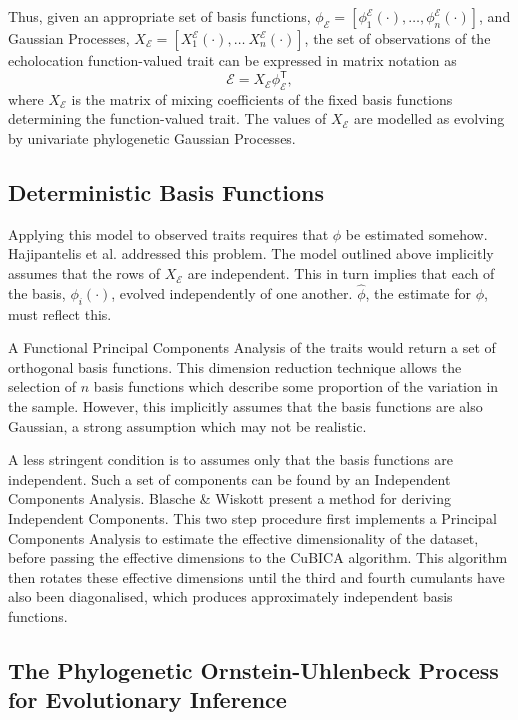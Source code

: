 \documentclass[wsdraft]{ws-rv9x6} %
\begin{document}
Thus, given an appropriate set of basis functions, \(\phi_{\mathcal{E}} = [\phi^{\mathcal{E}}_1(\cdot), \dots, \phi^{\mathcal{E}}_n(\cdot)]\), and Gaussian Processes, \(X_{\mathcal{E}} = [X_1^{\mathcal{E}}(\cdot), \dots\ X_n^{\mathcal{E}}(\cdot)]\), the set of observations of the echolocation function-valued trait can be expressed in matrix notation as 
\[
\mathcal{E} = X_{\mathcal{E}} \phi_{\mathcal{E}}^{\mathsf{T}},
\]
where \( X_{\mathcal{E}}\) is the matrix of mixing coefficients of the fixed basis functions determining the function-valued trait. The values of \( X_{\mathcal{E}}\) are modelled as evolving by univariate phylogenetic Gaussian Processes.

\subsection{Deterministic Basis Functions}

Applying this model to observed traits requires that \(\phi\) be estimated somehow. Hajipantelis et al. \cite{hadjipantelis2013function} addressed this problem. The model outlined above implicitly assumes that the rows of \(X_{\mathcal{E}}\) are independent. This in turn implies that each of the basis, \(\phi_i(\cdot)\), evolved independently of one another. \(\hat{\phi}\), the estimate for \(\phi\), must reflect this. 

A Functional Principal Components Analysis \cite{ramsay2006functional} of the traits would return a set of orthogonal basis functions. This dimension reduction technique allows the selection of \(n\) basis functions which describe some proportion of the variation in the sample. However, this implicitly assumes that the basis functions are also Gaussian, a strong assumption which may not be realistic.

A less stringent condition is to assumes only that the basis functions are independent. Such a set of components can be found by an Independent Components Analysis. Blasche \& Wiskott\cite{blaschke2004cubica} present a method for deriving Independent Components. This two step procedure first implements a Principal Components Analysis to estimate the effective dimensionality of the dataset, before passing the effective dimensions to the CuBICA algorithm. This algorithm then rotates these effective dimensions until the third and fourth cumulants have also been diagonalised, which produces approximately independent basis functions.

\subsection{The Phylogenetic Ornstein-Uhlenbeck Process for Evolutionary Inference}
\end{document}
